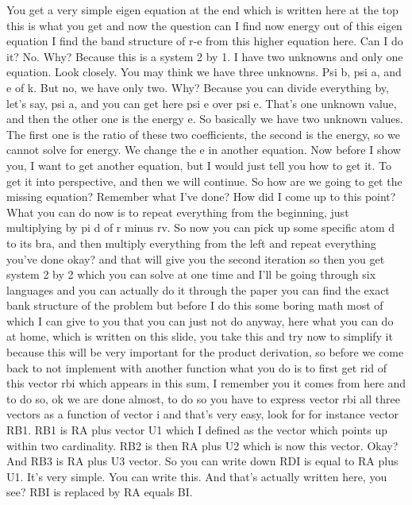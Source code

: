 You get a very simple eigen equation at the end which is written here at the top this is what you get and now the question can I find now energy out of this eigen equation I find the band structure of r-e from this higher equation here. Can I do it? No. Why? Because this is a system 2 by 1. I have two unknowns and only one equation. Look closely. You may think we have three unknowns. Psi b, psi a, and e of k. But no, we have only two. Why? Because you can divide everything by, let's say, psi a, and you can get here psi e over psi e. That's one unknown value, and then the other one is the energy e. So basically we have two unknown values. The first one is the ratio of these two coefficients, the second is the energy, so we cannot solve for energy. We change the e in another equation. Now before I show you, I want to get another equation, but I would just tell you how to get it. To get it into perspective, and then we will continue. So how are we going to get the missing equation? Remember what I've done? How did I come up to this point? What you can do now is to repeat everything from the beginning, just multiplying by pi d of r minus rv. So now you can pick up some specific atom d to its bra, and then multiply everything from the left and repeat everything you've done okay? and that will give you the second iteration so then you get system 2 by 2 which you can solve at one time and I'll be going through six languages and you can actually do it through the paper you can find the exact bank structure of the problem but before I do this some boring math most of which I can give to you that you can just not do anyway, here what you can do at home, which is written on this slide, you take this and try now to simplify it because this will be very important for the product derivation, so before we come back to not implement with another function what you do is to first get rid of this vector rbi which appears in this sum, I remember you it comes from here and to do so, ok we are done almost, to do so you have to express vector rbi all three vectors as a function of vector i and that's very easy, look for for instance vector RB1. RB1 is RA plus vector U1 which I defined as the vector which points up within two cardinality. RB2 is then RA plus U2 which is now this vector. Okay? And RB3 is RA plus U3 vector. So you can write down RDI is equal to RA plus U1. It's very simple. You can write this. And that's actually written here, you see? RBI is replaced by RA equals BI.\\
